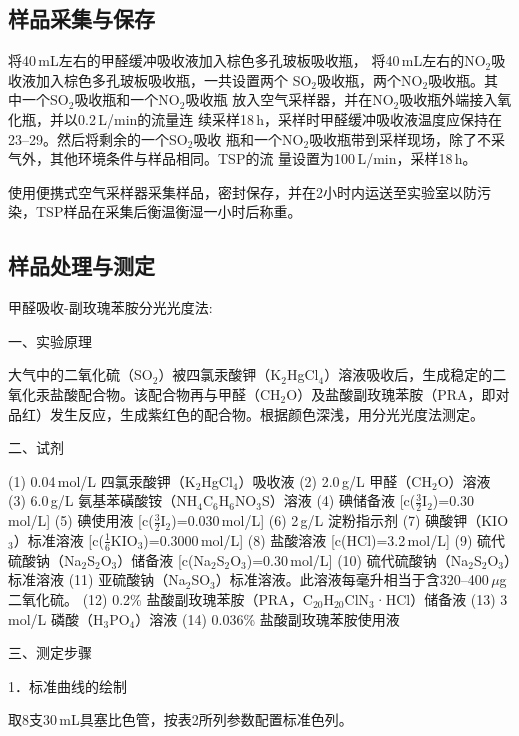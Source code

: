 \documentclass[12pt,hyperref,a4paper,UTF8]{ctexart}
\begin{document}
\subsection{样品采集与保存}
将40\,mL左右的甲醛缓冲吸收液加入棕色多孔玻板吸收瓶，
将40\,mL左右的NO$_2$吸收液加入棕色多孔玻板吸收瓶，一共设置两个
SO$_2$吸收瓶，两个NO$_2$吸收瓶。其中一个SO$_2$吸收瓶和一个NO$_2$吸收瓶
放入空气采样器，并在NO$_2$吸收瓶外端接入氧化瓶，并以0.2\,L/min的流量连
续采样18\,h，采样时甲醛缓冲吸收液温度应保持在23--29\textcelsius。然后将剩余的一个SO$_2$吸收
瓶和一个NO$_2$吸收瓶带到采样现场，除了不采气外，其他环境条件与样品相同。TSP的流
量设置为100\,L/min，采样18\,h。

使用便携式空气采样器采集样品，密封保存，并在2小时内运送至实验室以防污染，TSP样品在采集后衡温衡湿一小时后称重。

\subsection{样品处理与测定}

甲醛吸收-副玫瑰苯胺分光光度法:

一、实验原理

大气中的二氧化硫（SO$_2$）被四氯汞酸钾（K$_2$HgCl$_4$）溶液吸收后，生成稳定的二氧化汞盐酸配合物。该配合物再与甲醛（CH$_2$O）及盐酸副玫瑰苯胺（PRA，即对品红）发生反应，生成紫红色的配合物。根据颜色深浅，用分光光度法测定。

二、试剂

(1) 0.04\,mol/L 四氯汞酸钾（K$_2$HgCl$_4$）吸收液  
(2) 2.0\,g/L 甲醛（CH$_2$O）溶液  
(3) 6.0\,g/L 氨基苯磺酸铵（NH$_4$C$_6$H$_6$NO$_3$S）溶液  
(4) 碘储备液 [c($\frac{3}{2}$I$_2$)=0.30\,mol/L]  
(5) 碘使用液 [c($\frac{3}{2}$I$_2$)=0.030\,mol/L]  
(6) 2\,g/L 淀粉指示剂  
(7) 碘酸钾（KIO$_3$）标准溶液 [c($\frac{1}{6}$KIO$_3$)=0.3000\,mol/L]  
(8) 盐酸溶液 [c(HCl)=3.2\,mol/L]  
(9) 硫代硫酸钠（Na$_2$S$_2$O$_3$）储备液 [c(Na$_2$S$_2$O$_3$)=0.30\,mol/L]  
(10) 硫代硫酸钠（Na$_2$S$_2$O$_3$）标准溶液  
(11) 亚硫酸钠（Na$_2$SO$_3$）标准溶液。此溶液每毫升相当于含320--400\,$\mu$g二氧化硫。  
(12) 0.2\% 盐酸副玫瑰苯胺（PRA，C$_{20}$H$_{20}$ClN$_3$·HCl）储备液  
(13) 3\,mol/L 磷酸（H$_3$PO$_4$）溶液  
(14) 0.036\% 盐酸副玫瑰苯胺使用液  

三、测定步骤

1．标准曲线的绘制

取8支30\,mL具塞比色管，按表2所列参数配置标准色列。
\end{document}
